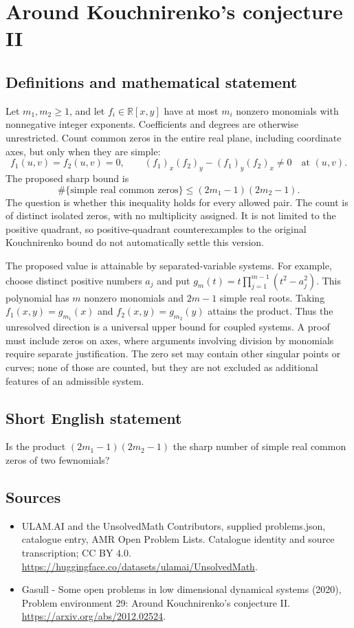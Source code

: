 \documentclass[11pt,a4paper]{article}
\begin{document}
\section*{Around Kouchnirenko's conjecture II}\label{statement}

\subsection{Definitions and mathematical statement}
Let $m_1,m_2\ge1$, and let $f_i\in\mathbb R[x,y]$ have at most $m_i$
nonzero monomials with nonnegative integer exponents. Coefficients and
degrees are otherwise unrestricted. Count common zeros in the entire
real plane, including coordinate axes, but only when they are simple:
\[
 f_1(u,v)=f_2(u,v)=0,\qquad
 (f_1)_x(f_2)_y-(f_1)_y(f_2)_x\ne0
 \quad\text{at }(u,v).
\]
The proposed sharp bound is
\[
 \#\{\text{simple real common zeros}\}
       \le(2m_1-1)(2m_2-1).
\]
The question is whether this inequality holds for every allowed pair.
The count is of distinct isolated zeros, with no multiplicity assigned.
It is not limited to the positive quadrant, so positive-quadrant
counterexamples to the original Kouchnirenko bound do not automatically
settle this version.

The proposed value is attainable by separated-variable systems. For
example, choose distinct positive numbers $a_j$ and put
$g_m(t)=t\prod_{j=1}^{m-1}(t^2-a_j^2)$. This polynomial has $m$
nonzero monomials and $2m-1$ simple real roots. Taking
$f_1(x,y)=g_{m_1}(x)$ and $f_2(x,y)=g_{m_2}(y)$ attains the product.
Thus the unresolved direction is a universal upper bound for coupled
systems. A proof must include zeros on axes, where arguments involving
division by monomials require separate justification. The zero set may
contain other singular points or curves; none of those are counted, but
they are not excluded as additional features of an admissible system.
\subsection{Short English statement}
Is the product $(2m_1-1)(2m_2-1)$ the sharp number of simple real common zeros of two fewnomials?
\subsection{Sources}
\begin{itemize}
\item[S1] ULAM.AI and the UnsolvedMath Contributors, supplied problems.json, catalogue entry, AMR Open Problem Lists. Catalogue identity and source transcription; CC BY 4.0.
\url{https://huggingface.co/datasets/ulamai/UnsolvedMath}.
\item[S2] Gasull - Some open problems in low dimensional dynamical systems (2020), Problem environment 29: Around Kouchnirenko's conjecture II. 
\url{https://arxiv.org/abs/2012.02524}.
\end{itemize}
\end{document}
